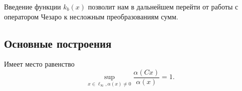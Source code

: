 Введение функции $k_b(x)$ позволит нам в дальнейшем перейти от работы с оператором Чезаро
к несложным преобразованиям сумм.



\subsection{Основные построения}

\begin{theorem}
	\label{thm:alpha_Cx_no_gamma}
	Имеет место равенство
	\begin{equation}
		\sup_{x\in\ell_\infty, \alpha(x)\neq 0} \frac{\alpha(Cx)}{\alpha(x)}=1
		.
	\end{equation}
\end{theorem}

